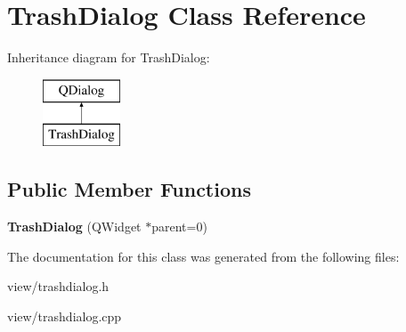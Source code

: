 \hypertarget{class_trash_dialog}{\section{Trash\-Dialog Class Reference}
\label{class_trash_dialog}
}
Inheritance diagram for Trash\-Dialog\-:\begin{figure}[H]
\begin{center}
\leavevmode
\includegraphics[height=2.000000cm]{class_trash_dialog}
\end{center}
\end{figure}
\subsection*{Public Member Functions}
\begin{DoxyCompactItemize}
\item 
\hypertarget{class_trash_dialog_a3f9d43b2f58bd6575c10c0763bacb77b}{{\bfseries Trash\-Dialog} (Q\-Widget $\ast$parent=0)}\label{class_trash_dialog_a3f9d43b2f58bd6575c10c0763bacb77b}

\end{DoxyCompactItemize}


The documentation for this class was generated from the following files\-:\begin{DoxyCompactItemize}
\item 
view/trashdialog.\-h\item 
view/trashdialog.\-cpp\end{DoxyCompactItemize}
